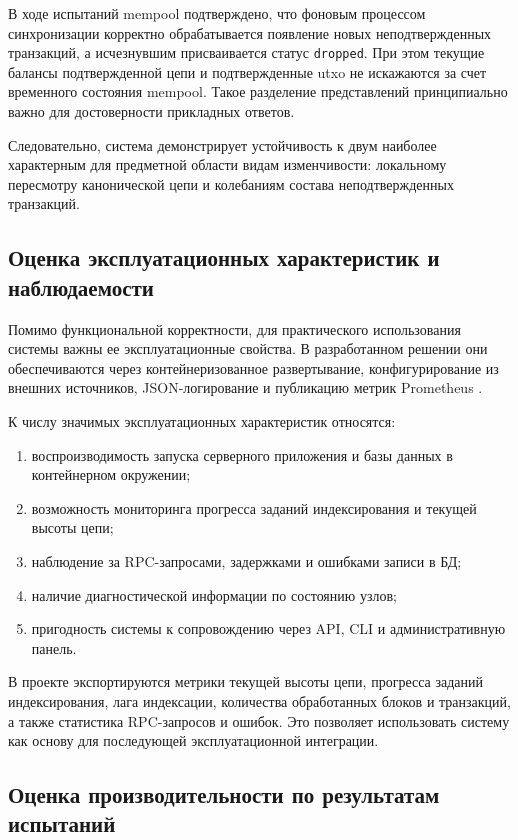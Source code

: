 В ходе испытаний mempool подтверждено, что фоновым процессом синхронизации корректно обрабатывается появление
новых неподтвержденных транзакций, а исчезнувшим присваивается статус
\texttt{dropped}. При этом текущие балансы подтвержденной цепи и подтвержденные \gls{utxo}
не искажаются за счет временного состояния mempool. Такое разделение
представлений принципиально важно для достоверности прикладных ответов.

Следовательно, система демонстрирует устойчивость к двум наиболее характерным
для предметной области видам изменчивости: локальному пересмотру канонической
цепи и колебаниям состава неподтвержденных транзакций.

\subsection{Оценка эксплуатационных характеристик и наблюдаемости}

Помимо функциональной корректности, для практического использования системы
важны ее эксплуатационные свойства. В разработанном решении они обеспечиваются
через контейнеризованное развертывание, конфигурирование из внешних источников,
JSON-логирование и публикацию метрик Prometheus \cite{prometheus_docs}.

К числу значимых эксплуатационных характеристик относятся:
\begin{enumerate}
    \item воспроизводимость запуска серверного приложения и базы данных в контейнерном окружении;
    \item возможность мониторинга прогресса заданий индексирования и текущей высоты цепи;
    \item наблюдение за RPC-запросами, задержками и ошибками записи в БД;
    \item наличие диагностической информации по состоянию узлов;
    \item пригодность системы к сопровождению через API, CLI и административную панель.
\end{enumerate}

В проекте экспортируются метрики текущей высоты цепи, прогресса заданий индексирования, лага
индексации, количества обработанных блоков и транзакций, а также статистика
RPC-запросов и ошибок. Это позволяет использовать систему как основу для последующей эксплуатационной
интеграции.

\subsection{Оценка производительности по результатам испытаний}


